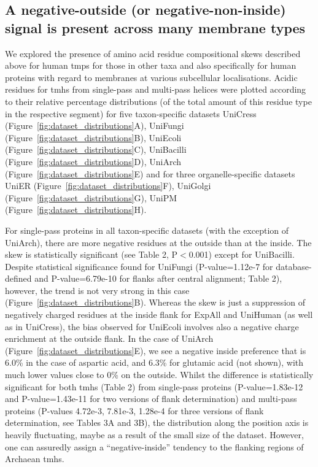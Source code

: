 \subsection{A negative-outside (or negative-non-inside) signal is present across many membrane types}

We explored the presence of amino acid residue compositional skews described above for human \gls{tmp}s for those in other taxa and also specifically for human proteins with regard to membranes at various subcellular localisations. Acidic residues for \gls{tmh}s from single-pass and multi-pass helices were plotted according to their relative percentage distributions (of the total amount of this residue type in the respective segment) for five taxon-specific datasets UniCress (Figure~\ref{fig:dataset_distributions}A), UniFungi (Figure~\ref{fig:dataset_distributions}B), UniEcoli (Figure~\ref{fig:dataset_distributions}C), UniBacilli (Figure~\ref{fig:dataset_distributions}D), UniArch (Figure~\ref{fig:dataset_distributions}E) and for three organelle-specific datasets UniER (Figure~\ref{fig:dataset_distributions}F), UniGolgi (Figure~\ref{fig:dataset_distributions}G), UniPM (Figure~\ref{fig:dataset_distributions}H).

For single-pass proteins in all taxon-specific datasets (with the exception of UniArch), there are more negative residues at the outside than at the inside. The skew is statistically significant (see Table 2, P$<$0.001) except for UniBacilli. Despite statistical significance found for UniFungi (P-value=1.12e-7 for database-defined and P-value=6.79e-10 for flanks after central alignment; Table 2), however, the trend is not very strong in this case (Figure~\ref{fig:dataset_distributions}B). Whereas the skew is just a suppression of negatively charged residues at the inside flank for ExpAll and UniHuman (as well as in UniCress), the bias observed for UniEcoli involves also a negative charge enrichment at the outside flank. In the case of UniArch (Figure~\ref{fig:dataset_distributions}E), we see a negative inside preference that is 6.0\% in the case of aspartic acid, and 6.3\% for glutamic acid (not shown), with much lower values close to 0\% on the outside. Whilst the difference is statistically significant for both \gls{tmh}s (Table 2) from single-pass proteins (P-value=1.83e-12 and P-value=1.43e-11 for two versions of flank determination) and multi-pass proteins (P-values 4.72e-3, 7.81e-3, 1.28e-4 for three versions of flank determination, see Tables 3A and 3B), the distribution along the position axis is heavily fluctuating, maybe as a result of the small size of the dataset. However, one can assuredly assign a ``negative-inside'' tendency to the flanking regions of Archaean \gls{tmh}s.

